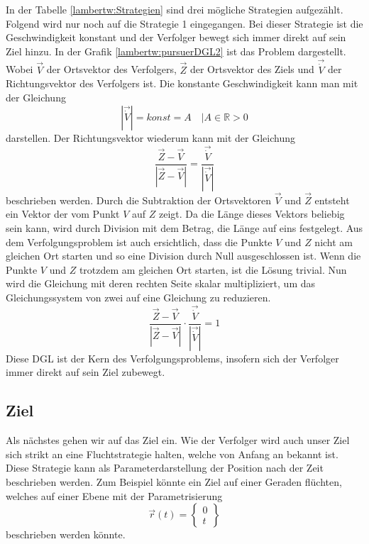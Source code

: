 In der Tabelle \eqref{lambertw:Strategien} sind drei mögliche Strategien aufgezählt. Folgend wird nur noch auf die Strategie 1 eingegangen. Bei dieser Strategie ist die Geschwindigkeit konstant und der Verfolger bewegt sich immer direkt auf sein Ziel hinzu. In der Grafik \eqref{lambertw:pursuerDGL2} ist das Problem dargestellt. Wobei $\overrightarrow{V}$ der Ortsvektor des Verfolgers, $\overrightarrow{Z}$ der Ortsvektor des Ziels und $\overrightarrow{\dot{V}}$ der Richtungsvektor des Verfolgers ist. Die konstante Geschwindigkeit kann man mit der Gleichung
\begin{equation}
    |\overrightarrow{\dot{V}}|
    =
    konst = A
    \quad|A\in\mathbb{R}>0
\end{equation}
darstellen. Der Richtungsvektor wiederum kann mit der Gleichung
\begin{equation}
    \frac{\overrightarrow{Z}-\overrightarrow{V}}{|\overrightarrow{Z}-\overrightarrow{V}|}
    =
    \frac{\overrightarrow{\dot{V}}}{|\overrightarrow{\dot{V}}|}
\end{equation}
beschrieben werden. Durch die Subtraktion der Ortsvektoren $\overrightarrow{V}$ und $\overrightarrow{Z}$ entsteht ein Vektor der vom Punkt $V$ auf $Z$ zeigt. Da die Länge dieses Vektors beliebig sein kann, wird durch Division mit dem Betrag, die Länge auf eins festgelegt.
Aus dem Verfolgungsproblem ist auch ersichtlich, dass die Punkte $V$ und $Z$ nicht am gleichen Ort starten und so eine Division durch Null ausgeschlossen ist. Wenn die Punkte $V$ und $Z$ trotzdem am gleichen Ort starten, ist die Lösung trivial.
Nun wird die Gleichung mit deren rechten Seite skalar multipliziert, um das Gleichungssystem von zwei auf eine Gleichung zu reduzieren.
\begin{equation}
    \label{pursuer:pursuerDGL}
    \frac{\overrightarrow{Z}-\overrightarrow{V}}{|\overrightarrow{Z}-\overrightarrow{V}|}\cdot \frac{\overrightarrow{\dot{V}}}{|\overrightarrow{\dot{V}}|}
    =
    1
\end{equation}
Diese DGL ist der Kern des Verfolgungsproblems, insofern sich der Verfolger immer direkt auf sein Ziel zubewegt.





\subsection{Ziel
\label{lambertw:subsection:Ziel}}
Als nächstes gehen wir auf das Ziel ein. Wie der Verfolger wird auch unser Ziel sich strikt an eine Fluchtstrategie halten, welche von Anfang an bekannt ist. Diese Strategie kann als Parameterdarstellung der Position nach der Zeit beschrieben werden. Zum Beispiel könnte ein Ziel auf einer Geraden flüchten, welches auf einer Ebene mit der Parametrisierung
\begin{equation}
    \vec{r}(t)
    =
    \begin{Bmatrix}
        0\\
        t
    \end{Bmatrix}
\end{equation}
beschrieben werden könnte.




